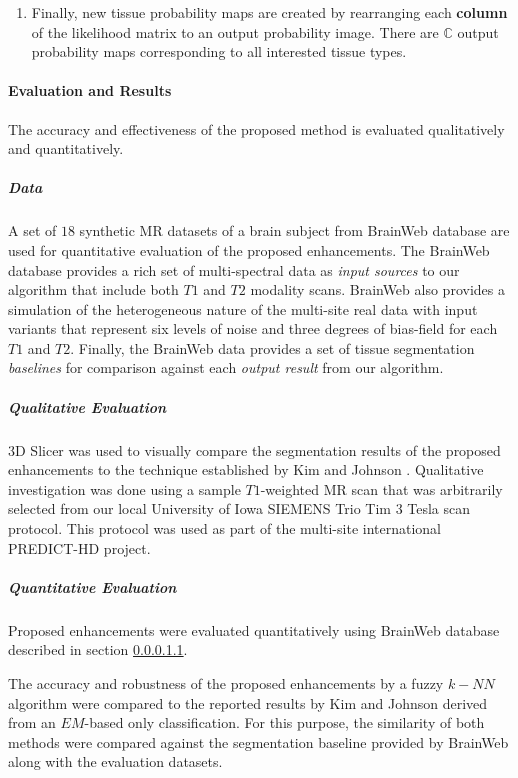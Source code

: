 \begin{enumerate}
\item Finally, new tissue probability maps are created by rearranging each \textbf{column} of the likelihood matrix to an output probability image. There are $\mathbb{C}$ output probability maps corresponding to all interested tissue types.
\end{enumerate}

\paragraph{Evaluation and Results} %

The accuracy and effectiveness of the proposed method is evaluated qualitatively and quantitatively.

\subparagraph{Data} %
\label{brainWebData}

A set of $18$ synthetic MR datasets of a brain subject from BrainWeb database \cite{Cocosco1997} are used for quantitative evaluation of the proposed enhancements.
The BrainWeb database provides a rich set of multi-spectral data as \textit{input sources} to our algorithm that include both $T1$ and $T2$ modality scans. BrainWeb also provides a simulation of the heterogeneous nature of the multi-site real data with input variants that represent six levels of noise and three degrees of bias-field for each $T1$ and $T2$. 
Finally, the BrainWeb data provides a set of tissue segmentation \textit{baselines} for comparison against each \textit{output result} from our algorithm.

\subparagraph{Qualitative Evaluation} %

3D Slicer \cite{slicer_paper} was used to visually compare the segmentation results of the proposed enhancements to the technique established by Kim and Johnson \cite{Kim2013}. 
Qualitative investigation was done using a sample $T1$-weighted MR scan that was arbitrarily selected from our local University of Iowa SIEMENS Trio Tim $3$ Tesla scan protocol.  This protocol was used as part of the multi-site international PREDICT-HD \cite{PREDICTHD} project.

\subparagraph{Quantitative Evaluation} %

Proposed enhancements were evaluated quantitatively using BrainWeb database described in section \ref{brainWebData}.

The accuracy and robustness of the proposed enhancements by a fuzzy $k-NN$ algorithm were compared to the reported results by Kim and Johnson \cite{Kim2013} derived from an $EM$-based only classification. For this purpose, the similarity of both methods were compared against the segmentation baseline provided by BrainWeb along with the evaluation datasets.

